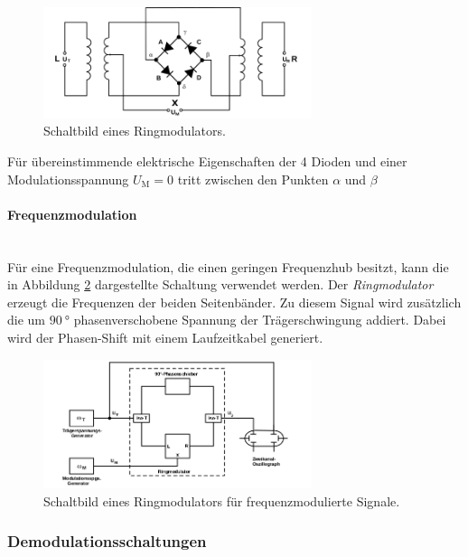 \begin{figure}
\centering
\includegraphics[width=0.7\textwidth]{figures/ringmodulator.PNG}
\caption{Schaltbild eines Ringmodulators.\cite{sample}}
\label{fig:Ringmodulator}
\end{figure}

Für übereinstimmende elektrische Eigenschaften
der 4 Dioden und einer Modulationsspannung $U_{\text{M}}=0$
tritt zwischen den Punkten $\alpha$ und $\beta$

\paragraph{Frequenzmodulation}
\mbox{}\\
Für eine Frequenzmodulation, die einen geringen Frequenzhub besitzt,
kann die in Abbildung \ref{fig:Ringmodulator_frequenz} dargestellte
Schaltung verwendet werden.
Der \textit{Ringmodulator} erzeugt die Frequenzen der beiden Seitenbänder.
Zu diesem Signal wird zusätzlich die um $\SI{90}{\degree}$ phasenverschobene
Spannung der Trägerschwingung addiert. Dabei wird der Phasen-Shift
mit einem Laufzeitkabel generiert.

\begin{figure}
\centering
\includegraphics[width=0.7\textwidth]{figures/frequenzmodulator.PNG}
\caption{Schaltbild eines Ringmodulators für frequenzmodulierte Signale.\cite{sample}}
\label{fig:Ringmodulator_frequenz}
\end{figure}

\subsubsection{Demodulationsschaltungen}
\label{subsubsec:demodulationschaltungen}
